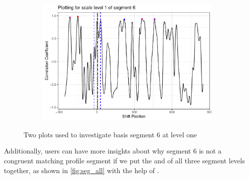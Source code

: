 \begin{figure}
\begin{subfigure}[t]{\textwidth}
\begin{adjustbox}{valign=t}
\begin{minipage}{.39\textwidth}
{\small {}
\begin{Schunk}
\end{Schunk}
}
\vspace{1em}
\end{minipage}
\begin{minipage}{.59\textwidth}
\includegraphics[width=\textwidth]{ju-hofmann_files/figure-latex/segplot2-1.pdf}
\end{minipage}
\end{adjustbox}
\end{subfigure}
\caption{\label{fig:segplots} Two plots used to investigate basis segment 6 at level one}
\end{figure}

Additionally, users can have more insights about why segment 6 is not a
congruent matching profile segment if we put the 
and  of all three segment levels together, as
shown in \autoref{fig:seg_all} with the help of
.

